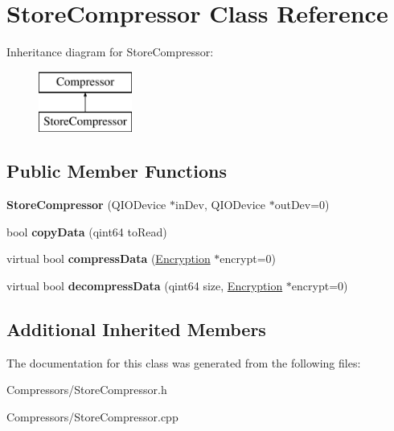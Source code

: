 \hypertarget{class_store_compressor}{}\section{Store\+Compressor Class Reference}
\label{class_store_compressor}
Inheritance diagram for Store\+Compressor\+:\begin{figure}[H]
\begin{center}
\leavevmode
\includegraphics[height=2.000000cm]{class_store_compressor}
\end{center}
\end{figure}
\subsection*{Public Member Functions}
\begin{DoxyCompactItemize}
\item 
{\bfseries Store\+Compressor} (Q\+I\+O\+Device $\ast$in\+Dev, Q\+I\+O\+Device $\ast$out\+Dev=0)\hypertarget{class_store_compressor_af296b668a59ea4f24edaeeb3d8b7e8bb}{}\label{class_store_compressor_af296b668a59ea4f24edaeeb3d8b7e8bb}

\item 
bool {\bfseries copy\+Data} (qint64 to\+Read)\hypertarget{class_store_compressor_a4de4736cc9cfa1c1cd24d6e6a5a64f84}{}\label{class_store_compressor_a4de4736cc9cfa1c1cd24d6e6a5a64f84}

\item 
virtual bool {\bfseries compress\+Data} (\hyperlink{class_encryption}{Encryption} $\ast$encrypt=0)\hypertarget{class_store_compressor_ac297ec67c0068c3677676ed3c79f81b4}{}\label{class_store_compressor_ac297ec67c0068c3677676ed3c79f81b4}

\item 
virtual bool {\bfseries decompress\+Data} (qint64 size, \hyperlink{class_encryption}{Encryption} $\ast$encrypt=0)\hypertarget{class_store_compressor_a16e34adff9e85a968fa6b38ee884d4eb}{}\label{class_store_compressor_a16e34adff9e85a968fa6b38ee884d4eb}

\end{DoxyCompactItemize}
\subsection*{Additional Inherited Members}


The documentation for this class was generated from the following files\+:\begin{DoxyCompactItemize}
\item 
Compressors/Store\+Compressor.\+h\item 
Compressors/Store\+Compressor.\+cpp\end{DoxyCompactItemize}
